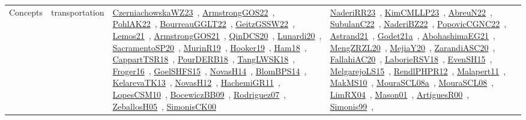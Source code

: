 {\begin{longtable}{lp{3cm}>{\raggedright\arraybackslash}p{6cm}>{\raggedright\arraybackslash}p{6cm}>{\raggedright\arraybackslash}p{8cm}}
Concepts & transportation & \href{works/CzerniachowskaWZ23.pdf}{CzerniachowskaWZ23}~\cite{CzerniachowskaWZ23}, \href{works/ArmstrongGOS22.pdf}{ArmstrongGOS22}~\cite{ArmstrongGOS22}, \href{works/PohlAK22.pdf}{PohlAK22}~\cite{PohlAK22}, \href{works/BourreauGGLT22.pdf}{BourreauGGLT22}~\cite{BourreauGGLT22}, \href{works/GeitzGSSW22.pdf}{GeitzGSSW22}~\cite{GeitzGSSW22}, \href{works/Lemos21.pdf}{Lemos21}~\cite{Lemos21}, \href{works/ArmstrongGOS21.pdf}{ArmstrongGOS21}~\cite{ArmstrongGOS21}, \href{works/QinDCS20.pdf}{QinDCS20}~\cite{QinDCS20}, \href{works/Lunardi20.pdf}{Lunardi20}~\cite{Lunardi20}, \href{works/SacramentoSP20.pdf}{SacramentoSP20}~\cite{SacramentoSP20}, \href{works/MurinR19.pdf}{MurinR19}~\cite{MurinR19}, \href{works/Hooker19.pdf}{Hooker19}~\cite{Hooker19}, \href{works/Ham18.pdf}{Ham18}~\cite{Ham18}, \href{works/CappartTSR18.pdf}{CappartTSR18}~\cite{CappartTSR18}, \href{works/PourDERB18.pdf}{PourDERB18}~\cite{PourDERB18}, \href{works/TangLWSK18.pdf}{TangLWSK18}~\cite{TangLWSK18}, \href{works/Froger16.pdf}{Froger16}~\cite{Froger16}, \href{works/GoelSHFS15.pdf}{GoelSHFS15}~\cite{GoelSHFS15}, \href{works/NovasH14.pdf}{NovasH14}~\cite{NovasH14}, \href{works/BlomBPS14.pdf}{BlomBPS14}~\cite{BlomBPS14}, \href{works/KelarevaTK13.pdf}{KelarevaTK13}~\cite{KelarevaTK13}, \href{works/NovasH12.pdf}{NovasH12}~\cite{NovasH12}, \href{works/HachemiGR11.pdf}{HachemiGR11}~\cite{HachemiGR11}, \href{works/LopesCSM10.pdf}{LopesCSM10}~\cite{LopesCSM10}, \href{works/BocewiczBB09.pdf}{BocewiczBB09}~\cite{BocewiczBB09}, \href{works/Rodriguez07.pdf}{Rodriguez07}~\cite{Rodriguez07}, \href{works/ZeballosH05.pdf}{ZeballosH05}~\cite{ZeballosH05}, \href{works/SimonisCK00.pdf}{SimonisCK00}~\cite{SimonisCK00} & \href{works/NaderiRR23.pdf}{NaderiRR23}~\cite{NaderiRR23}, \href{works/KimCMLLP23.pdf}{KimCMLLP23}~\cite{KimCMLLP23}, \href{works/AbreuN22.pdf}{AbreuN22}~\cite{AbreuN22}, \href{works/SubulanC22.pdf}{SubulanC22}~\cite{SubulanC22}, \href{works/NaderiBZ22.pdf}{NaderiBZ22}~\cite{NaderiBZ22}, \href{works/PopovicCGNC22.pdf}{PopovicCGNC22}~\cite{PopovicCGNC22}, \href{works/Astrand21.pdf}{Astrand21}~\cite{Astrand21}, \href{works/Godet21a.pdf}{Godet21a}~\cite{Godet21a}, \href{works/AbohashimaEG21.pdf}{AbohashimaEG21}~\cite{AbohashimaEG21}, \href{works/MengZRZL20.pdf}{MengZRZL20}~\cite{MengZRZL20}, \href{works/MejiaY20.pdf}{MejiaY20}~\cite{MejiaY20}, \href{works/ZarandiASC20.pdf}{ZarandiASC20}~\cite{ZarandiASC20}, \href{works/FallahiAC20.pdf}{FallahiAC20}~\cite{FallahiAC20}, \href{works/LaborieRSV18.pdf}{LaborieRSV18}~\cite{LaborieRSV18}, \href{works/EvenSH15.pdf}{EvenSH15}~\cite{EvenSH15}, \href{works/MelgarejoLS15.pdf}{MelgarejoLS15}~\cite{MelgarejoLS15}, \href{works/RendlPHPR12.pdf}{RendlPHPR12}~\cite{RendlPHPR12}, \href{works/Malapert11.pdf}{Malapert11}~\cite{Malapert11}, \href{works/MakMS10.pdf}{MakMS10}~\cite{MakMS10}, \href{works/MouraSCL08a.pdf}{MouraSCL08a}~\cite{MouraSCL08a}, \href{works/MouraSCL08.pdf}{MouraSCL08}~\cite{MouraSCL08}, \href{works/LimRX04.pdf}{LimRX04}~\cite{LimRX04}, \href{works/Mason01.pdf}{Mason01}~\cite{Mason01}, \href{works/ArtiguesR00.pdf}{ArtiguesR00}~\cite{ArtiguesR00}, \href{works/Simonis99.pdf}{Simonis99}~\cite{Simonis99}, 
\end{longtable}}
